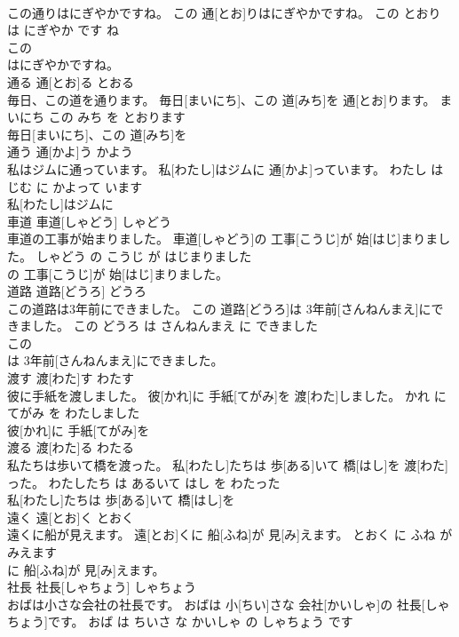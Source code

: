 \documentclass[8pt]{extreport}
\begin{document}
\begin{CJK}{UTF8}{min}
\\	この通りはにぎやかですね。	この 通[とお]りはにぎやかですね。	この とおり は にぎやか です ね	
\\	この
\\	はにぎやかですね。			
\\	通る	通[とお]る	とおる	
\\	毎日、この道を通ります。	毎日[まいにち]、この 道[みち]を 通[とお]ります。	まいにち この みち を とおります	
\\	毎日[まいにち]、この 道[みち]を
\\	通う	通[かよ]う	かよう	
\\	私はジムに通っています。	私[わたし]はジムに 通[かよ]っています。	わたし は じむ に かよって います	
\\	私[わたし]はジムに
\\	車道	車道[しゃどう]	しゃどう	
\\	車道の工事が始まりました。	車道[しゃどう]の 工事[こうじ]が 始[はじ]まりました。	しゃどう の こうじ が はじまりました	
\\	の 工事[こうじ]が 始[はじ]まりました。			
\\	道路	道路[どうろ]	どうろ	
\\	この道路は3年前にできました。	この 道路[どうろ]は 3年前[さんねんまえ]にできました。	この どうろ は さんねんまえ に できました	
\\	この
\\	は 3年前[さんねんまえ]にできました。			
\\	渡す	渡[わた]す	わたす	
\\	彼に手紙を渡しました。	彼[かれ]に 手紙[てがみ]を 渡[わた]しました。	かれ に てがみ を わたしました	
\\	彼[かれ]に 手紙[てがみ]を
\\	渡る	渡[わた]る	わたる	
\\	私たちは歩いて橋を渡った。	私[わたし]たちは 歩[ある]いて 橋[はし]を 渡[わた]った。	わたしたち は あるいて はし を わたった	
\\	私[わたし]たちは 歩[ある]いて 橋[はし]を
\\	遠く	遠[とお]く	とおく	
\\	遠くに船が見えます。	遠[とお]くに 船[ふね]が 見[み]えます。	とおく に ふね が みえます	
\\	に 船[ふね]が 見[み]えます。			
\\	社長	社長[しゃちょう]	しゃちょう	
\\	おばは小さな会社の社長です。	おばは 小[ちい]さな 会社[かいしゃ]の 社長[しゃちょう]です。	おば は ちいさ な かいしゃ の しゃちょう です	

\end{CJK}
\end{document}
